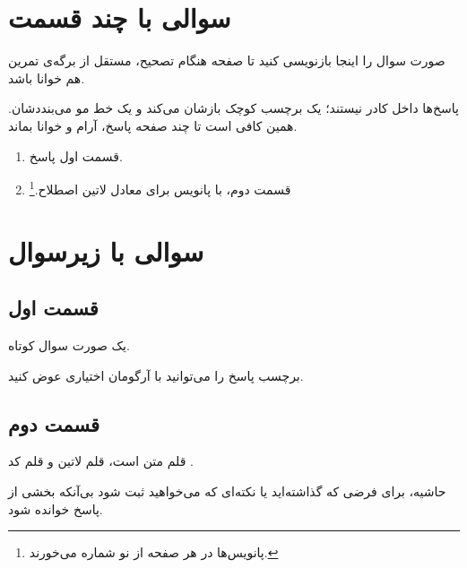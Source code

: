 \section{سوالی با چند قسمت }

\begin{question}
    صورت سوال را اینجا بازنویسی کنید تا صفحه هنگام تصحیح، مستقل از برگه‌ی
    تمرین هم خوانا باشد.
\end{question}

\begin{answer}
    پاسخ‌ها داخل کادر نیستند؛ یک برچسب کوچک بازشان می‌کند و یک خط مو
    می‌بنددشان. همین کافی است تا چند صفحه پاسخ، آرام و خوانا بماند.

    \begin{enumerate}
        \item قسمت اول پاسخ.
        \item قسمت دوم، با پانویس برای معادل لاتین اصطلاح.\footnote{%
              پانویس‌ها در هر صفحه از نو شماره می‌خورند.}
    \end{enumerate}

\end{answer}

\section{سوالی با زیرسوال }

\subsection{قسمت اول}

\begin{question}
    یک صورت سوال کوتاه.
\end{question}

\begin{answer}
    برچسب پاسخ را می‌توانید با آرگومان اختیاری عوض کنید.
\end{answer}

\subsection{قسمت دوم}

\begin{answer}
    قلم متن  است، قلم لاتین  و قلم کد .

    \begin{aside}
        حاشیه، برای فرضی که گذاشته‌اید یا نکته‌ای که می‌خواهید ثبت شود
        بی‌آنکه بخشی از پاسخ خوانده شود.
    \end{aside}
\end{answer}
